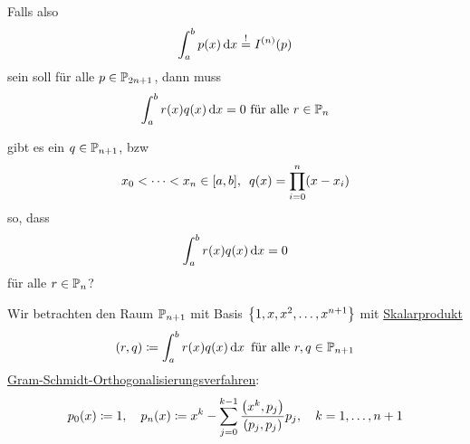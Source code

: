 \documentclass{../Skript}
\begin{document}
Falls also \[
    \int_a^b p(x) \mathop{}\!\mathrm{d} x \overset{!}{=}I^{(n)}(p)\]
sein soll für alle $p\in\mathbb{P}_{2n+1}$, dann muss \[
    \int_a^b r(x) q(x) \mathop{}\!\mathrm{d} x = 0 \text{ für alle $r\in \mathbb{P}_n$}\]
\begin{question}
    gibt es ein $q\in \mathbb{P}_{n+1}$, bzw \[x_0 < \dots < x_n \in [a,b], \hspace{.5em} q(x) = \prod_{i=0}^n(x-x_i)\]
    so, dass \[
        \int_a^b r(x)q(x)\mathop{}\!\mathrm{d} x = 0\]
    für alle $r\in \mathbb{P}_n$?
\end{question}
Wir betrachten den Raum $\mathbb{P}_{n+1}$ mit Basis $\left\{ 1,x,x^2,\dots,x^{n+1} \right\}$ mit
\underline{Skalarprodukt} \[
    (r,q)\coloneqq \int_a^b r(x)q(x)\mathop{}\!\mathrm{d} x\hspace{.5em} \text{für alle }r,q\in\mathbb{P}_{n+1}\]
\underline{Gram-Schmidt-Orthogonalisierungsverfahren}:\[p_0(x) \coloneqq 1, \largespace
p_n(x) \coloneqq x^k - \dsum_{j=0}^{k-1}\frac{\left(x^k, p_j\right)}{\left(p_j,p_j\right)}p_j, \largespace \igb k 1 {n+1}\]
\end{document}
